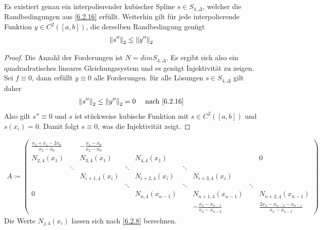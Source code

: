 \begin{Kore}\label{6.2.17}
  Es existiert genau ein interpolierender kubischer Spline 
  $s\in S_{4,\Delta}$, welcher die Randbedingungen aus \ref{6.2.16}
  erfüllt.
  Weiterhin gilt für jede interpolierende Funktion $y\in C^2([a,b])$,
  die derselben Randbedingung genügt
  \begin{gather*}
    \nn[s'']_2 \leq \nn[y'']_2
  \end{gather*}

  \begin{proof}
    Die Anzahl der Forderungen ist $N=dim S_{4,\Delta}$.
    Es ergibt sich also ein quadradratisches lineares Gleichungssystem
    und es genügt Injektivität zu zeigen.\\
    Sei $f\equiv 0$, dann erfüllt $y\equiv 0$ alle Forderungen.
    für alle Lösungen $s\in S_{4,\Delta}$ gilt daher
    \begin{gather*}
      \nn[s'']_2\leq \nn[y'']_2 =0 \quad \text{ nach \ref{6.2.16}}
    \end{gather*}
    Also gilt $s''\equiv 0$ und $s$ ist stückweise kubische Funktion
    mit $s\in C^2([a,b])$  und $s(x_i)=0$.
    Damit folgt $s\equiv 0$, was die Injektivität zeigt.
  \end{proof}
\end{Kore}



\label{5.2.18}
\begin{gather*}
  A \coloneqq 
  \left(\begin{array}{ccccccccc}
          \frac{x_2+x_1-2x_0}{x_2-x_0}& & -\frac{x_1-x_0}{x_2-x_0}& && & & & \\
          N_{2,4}(x_1)&&N_{3,4}(x_1) &&N_{4,4}(x_1)  & &&&0 \\
                                      &\ddots & &\ddots& &\ddots &  &&\\
                                      & & N_{i+1,4}(x_i)&& N_{i+2,4}(x_i) && N_{i+3,4}(x_i) && \\
                                      & &  &\ddots& &\ddots &&\ddots  &\\
          0&&&  &N_{n,4}(x_{n-1}) &&N_{n+1,4}(x_{n-1}) &&N_{n+2,4}(x_{n-1}) \\
                                      & & && && -\frac{x_n-x_{n-1}}{x_n-x_{n-2}} && \frac{2
                                                                                    x_n-x_{n-2}-x_{n-1}}{x_n-x_{n-2}}
        \end{array}\right)
    \end{gather*}
    Die Werte $N_{j,4}(x_i)$ lassen sich nach \ref{6.2.8} berechnen.


